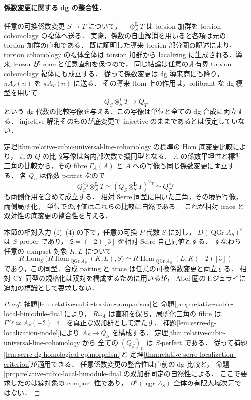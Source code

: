\paragraph{係数変更に関する dg の整合性．}
任意の可換係数変更 $S\to T$ について，
$-\otimes_S^{\mathbf L}T$ は torsion 加群を torsion cohomology の複体へ送る．
実際，係数の自由解消を用いると各項は元の torsion 加群の直和である．
既に証明した導来 torsion 部分圏の記述により，torsion cohomology の複体全体は
torsion 加群から localizing に生成される．導来 tensor が cone と任意直和を保つので，
同じ結論は任意の非有界 torsion cohomology 複体にも成立する．
従って係数変更は dg 導来商にも降り，$\pi A_S(n)$ を $\pi A_T(n)$ に送る．
その導来 Hom 上の作用は，cofibrant な dg 模型を用いて
\[
 Q_S\otimes_S^{\mathbf L}T\longrightarrow Q_T
\]
という dg 代数の比較写像を与える．この写像は単位と全ての dg 合成に両立する．
injective 解消そのものが底変更で injective のままであるとは仮定していない．

定理\ref{thm:relative-cubic-universal-line-cohomology}の標準の Hom 底変更比較により，
この $Q$ の比較写像は各内部次数で擬同型となる．
$A$ の係数平坦性と標準三角の比較から，その fibre $\Gamma_A(A)$ と
$A$ への写像も同じ係数変更に両立する．
各 $Q_n$ は係数 perfect なので
\[
 Q_S^{\vee_S}\otimes_S^{\mathbf L}T
 \simeq(Q_S\otimes_S^{\mathbf L}T)^{\vee_T}
 \simeq Q_T^{\vee_T}
\]
も両側作用を含めて成立する．
相対 Serre 同型に用いた三角，その境界写像，両側局所化，
単位での評価はこれらの比較に自然である．
これが相対 trace と双対性の底変更の整合性を与える．



\begin{theorem}
\label{thm:koszul-cubic-relative-serre}
本節の相対入力 \textup{(1)--(4)} の下で，任意の可換 $P$-代数 $S$ に対し，
$D(\operatorname{QGr}A_S)^c$ は $S$-proper であり，
$\mathsf S=(-2)[3]$ を相対 Serre 自己同値とする．
すなわち任意の compact 対象 $K,L$ について
\[
 R\operatorname{Hom}_S
 \bigl(R\operatorname{Hom}_{\operatorname{QGr}A_S}(K,L),S\bigr)
 \simeq R\operatorname{Hom}_{\operatorname{QGr}A_S}(L,K(-2)[3])
\]
であり，この同型，合成 pairing と trace は任意の可換係数変更と両立する．
相対 CY 同型の規格化は双対を構成するために用いるが，
Abel 圏のモジュライに追加の標識として要求しない．
\end{theorem}
\begin{proof}
補題\ref{lem:relative-cubic-torsion-comparison}と
命題\ref{prop:relative-cubic-local-bimodule-dual}により，
$R\omega_A$ は直和を保ち，局所化三角の fibre は
$\Gamma^{\vee_S}\simeq A_S(-2)[4]$ を真正な双加群として満たす．
補題\ref{lem:serre-dg-localization-model}により $A_S\to Q_S$ を構成する．
定理\ref{thm:relative-cubic-universal-line-cohomology}から
全ての $(Q_S)_n$ は $S$-perfect である．
従って補題\ref{lem:serre-dg-homological-epimorphism}と
定理\ref{thm:relative-serre-localization-criterion}が適用できる．
任意係数変更の整合性は直前の dg 比較と，
命題\ref{prop:relative-cubic-local-bimodule-dual}の双加群同定の自然性による．
ここで要求したのは線対象の compact 性であり，
$D^b(\operatorname{qgr}A_S)$ 全体の有限大域次元ではない．
\end{proof}

